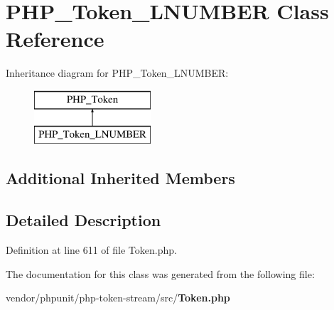 \section{P\+H\+P\+\_\+\+Token\+\_\+\+L\+N\+U\+M\+B\+E\+R Class Reference}
\label{class_p_h_p___token___l_n_u_m_b_e_r}
Inheritance diagram for P\+H\+P\+\_\+\+Token\+\_\+\+L\+N\+U\+M\+B\+E\+R\+:\begin{figure}[H]
\begin{center}
\leavevmode
\includegraphics[height=2.000000cm]{class_p_h_p___token___l_n_u_m_b_e_r}
\end{center}
\end{figure}
\subsection*{Additional Inherited Members}


\subsection{Detailed Description}


Definition at line 611 of file Token.\+php.



The documentation for this class was generated from the following file\+:\begin{DoxyCompactItemize}
\item 
vendor/phpunit/php-\/token-\/stream/src/{\bf Token.\+php}\end{DoxyCompactItemize}
